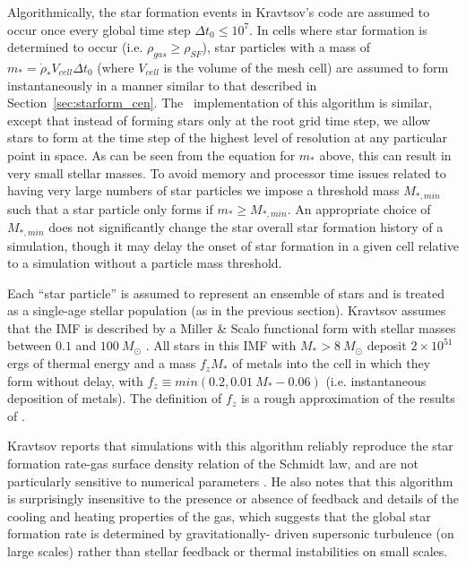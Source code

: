 Algorithmically, the star formation events in Kravtsov's code are
assumed to occur once every global time step $\Delta t_0 \leq 10^7$.
In cells where star formation is determined to occur (i.e. $\rho_{gas}
\geq \rho_{SF}$), star particles with a mass of $m_* = \dot{\rho}_*
V_{cell} \Delta t_0$ (where $V_{cell}$ is the volume of the mesh cell)
are assumed to form instantaneously in a manner similar to that
described in Section~\ref{sec:starform_cen}.  The \enzo\
implementation of this algorithm is similar, except that instead of
forming stars only at the root grid time step, we allow stars to form
at the time step of the highest level of resolution at any particular
point in space.  As can be seen from the equation for $m_*$ above,
this can result in very small stellar masses.  To avoid memory and
processor time issues related to having very large numbers of star
particles we impose a threshold mass $M_{*,min}$ such that a star
particle only forms if $m_* \geq M_{*,min}$.  An appropriate choice of
$M_{*,min}$ does not significantly change the star overall star
formation history of a simulation, though it may delay the onset of
star formation in a given cell relative to a simulation without a
particle mass threshold.

Each ``star particle'' is assumed to represent an ensemble of stars
and is treated as a single-age stellar population (as in the previous
section).  Kravtsov assumes that the IMF is described by a Miller \&
Scalo functional form with stellar masses between $0.1$ and
$100~M_\odot$ \citep{1979ApJS...41..513M}.  All stars in this IMF with
$M_* > 8~M_\odot$ deposit $2 \times 10^{51}$ ergs of thermal energy
and a mass $f_z M_*$ of metals into the cell in which they form
without delay, with $f_z \equiv min(0.2, 0.01~M_*-0.06)$
(i.e. instantaneous deposition of metals).  The definition of $f_z$ is
a rough approximation of the results of \citet{1995ApJS..101..181W}.

Kravtsov reports that simulations with this algorithm reliably
reproduce the star formation rate-gas surface density relation of the
Schmidt law, and are not particularly sensitive to numerical
parameters \citep{2003ApJ...590L...1K}.  He also notes that this
algorithm is surprisingly insensitive to the presence or absence of
feedback and details of the cooling and heating properties of the gas,
which suggests that the global star formation rate is determined by
gravitationally- driven supersonic turbulence (on large scales) rather
than stellar feedback or thermal instabilities on small scales.


